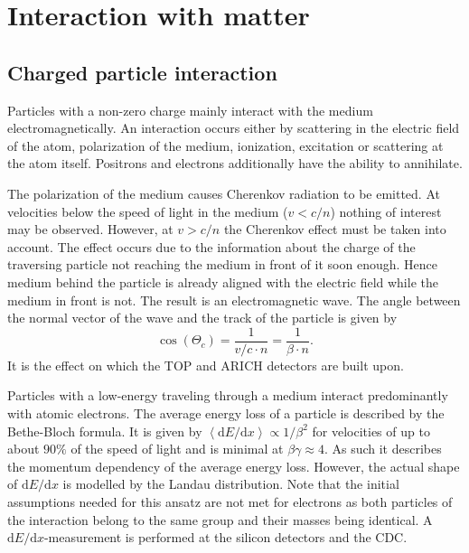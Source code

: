 \section{Interaction with matter}
\label{sec:interaction_with_matter}

\subsection{Charged particle interaction}
\label{subsec:interaction_with_matter}

Particles with a non-zero charge mainly interact with the medium electromagnetically. An interaction occurs either by scattering in the electric field of the atom, polarization of the medium, ionization, excitation or scattering at the atom itself. Positrons and electrons additionally have the ability to annihilate.

The polarization of the medium causes Cherenkov radiation to be emitted. At velocities below the speed of light in the medium ($v < c/n$) nothing of interest may be observed. However, at $v > c/n$ the Cherenkov effect must be taken into account. The effect occurs due to the information about the charge of the traversing particle not reaching the medium in front of it soon enough. Hence medium behind the particle is already aligned with the electric field while the medium in front is not. The result is an electromagnetic wave. The angle between the normal vector of the wave and the track of the particle is given by
\begin{equation*}
	\cos(\Theta_{c}) = \frac{1}{v/c \cdot n} = \frac{1}{\beta \cdot n}
	\mathrm{.}
\end{equation*}
It is the effect on which the TOP and ARICH detectors are built upon.

Particles with a low-energy traveling through a medium interact predominantly with atomic electrons. The average energy loss of a particle is described by the Bethe-Bloch formula. It is given by $\left< \mathrm{d}E/\mathrm{d}x \right> \propto 1/{\beta^2}$ for velocities of up to about $90\%$ of the speed of light and is minimal at $\beta \gamma \approx 4$. As such it describes the momentum dependency of the average energy loss. However, the actual shape of $\mathrm{d}E/\mathrm{d}x$ is modelled by the Landau distribution. Note that the initial assumptions needed for this ansatz are not met for electrons as both particles of the interaction belong to the same group and their masses being identical.
A $\mathrm{d}E/\mathrm{d}x$-measurement is performed at the silicon detectors and the CDC.

